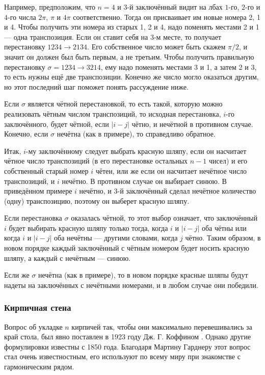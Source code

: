 Например, предположим, что $n = 4$ и $3$-й заключённый видит на лбах $1$-го, $2$-го и $4$-го числа $2\pi$, $\pi$ и $4\pi$ соответственно.
Тогда он присваивает им новые номера 2, 1 и 4.
Чтобы получить эти номера из старых 1, 2 и 4, надо поменять местами 2 и 1 --- одна транспозиция.
Если он ставит себя на 3-м месте, то получает перестановку $1234 \to  2134$.
Его собственное число может быть скажем $\pi/2$, и значит он должен был быть первым, а не третьим.
Чтобы получить правильную перестановку  $\sigma  = 1234 \to  3214$, ему надо поменять местами 3 и 1, а затем 2 и 3, то есть нужны ещё две транспозиции.
Конечно же число могло оказаться другим, но этот последний шаг поможет понять рассуждение ниже.

Если $\sigma$ является чётной перестановкой, то есть такой, которую можно реализовать чётным числом транспозиций, то исходная перестановка, $i$-го заключённого, будет чётной, если $|i - j|$ чётно, и нечётной в противном случае.
Конечно, если $\sigma$ нечётна (как в примере), то справедливо обратное.

Итак, $i$-му заключённому следует выбрать красную шляпу, если он насчитает чётное число транспозиций (в его перестановке остальных $n - 1$ чисел) и его собственный старый номер $i$ чётен, или же если он насчитает нечётное число транспозиций, и $i$ нечётно.
В противном случае он выбирает синюю.
В приведённом примере $i$ нечётно, и $3$-й заключённый сделал нечётное количество (одну) транспозицию, поэтому он выберет красную шляпу.

Если перестановка $\sigma$ оказалась чётной, то этот выбор означает, что заключённый $i$ будет выбирать красную шляпу только тогда, когда $i$ и $|i - j|$ оба чётны или когда $i$ и $|i - j|$ оба нечётны --- другими словами, когда $j$ чётно.
Таким образом, в новом порядке каждый заключённый с чётным номером будет носить красную шляпу, а каждый с нечётным --- синюю.

Если же $\sigma$ нечётна (как в примере), то в новом порядке красные шляпы будут надеты на заключённых с нечётными номерами, и в любом случае они победили.

\subsubsection*{Кирпичная стена}

Вопрос об укладке $n$ кирпичей так, чтобы они максимально перевешивались за край стола, был явно поставлен в 1923 году Дж. Г. Коффином \cite{12}.
Однако другие формулировки известны с 1850 года.
Благодаря Мартину Гарднеру этот вопрос стал очень известностным, его используют по всему миру при знакомстве с гармоническим рядом.

